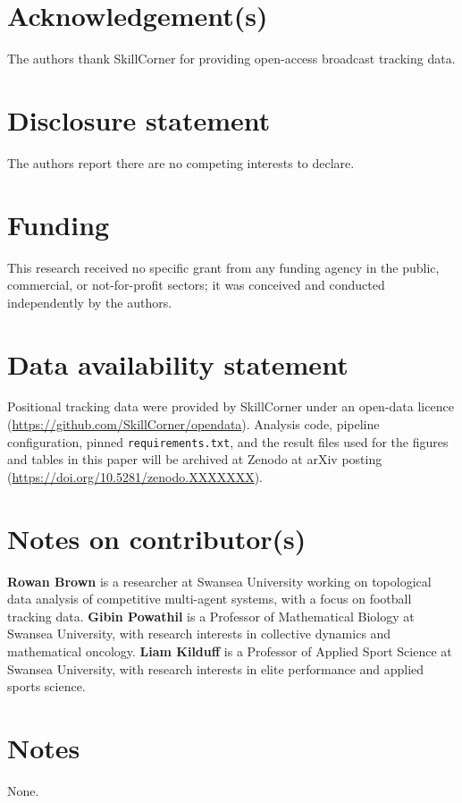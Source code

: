 \section*{Acknowledgement(s)}
The authors thank SkillCorner for providing open-access broadcast tracking data.

\section*{Disclosure statement}
The authors report there are no competing interests to declare.

\section*{Funding}
This research received no specific grant from any funding agency in the
public, commercial, or not-for-profit sectors; it was conceived and
conducted independently by the authors.

\section*{Data availability statement}
Positional tracking data were provided by SkillCorner under an open-data
licence \cite{SkillCorner2024}
(\url{https://github.com/SkillCorner/opendata}). Analysis code,
pipeline configuration, pinned \texttt{requirements.txt}, and the result
files used for the figures and tables in this paper will be archived at
Zenodo at arXiv posting
(\url{https://doi.org/10.5281/zenodo.XXXXXXX}).

\section*{Notes on contributor(s)}
\textbf{Rowan Brown} is a researcher at Swansea University working on
topological data analysis of competitive multi-agent systems, with a
focus on football tracking data.
\textbf{Gibin Powathil} is a Professor of Mathematical Biology at
Swansea University, with research interests in collective dynamics and
mathematical oncology.
\textbf{Liam Kilduff} is a Professor of Applied Sport Science at
Swansea University, with research interests in elite performance and
applied sports science.

\section*{Notes}
None.
